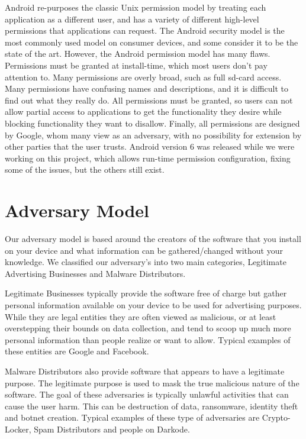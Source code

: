 Android re-purposes the classic Unix permission model by treating each application as a different user, and has a variety of different high-level permissions that applications can request.
The Android security model is the most commonly used model on consumer devices, and some consider it to be the state of the art.
However, the Android permission model has many flaws.
Permissions must be granted at install-time, which most users don't pay attention to.
Many permissions are overly broad, such as full sd-card access.
Many permissions have confusing names and descriptions, and it is difficult to find out what they really do.
All permissions must be granted, so users can not allow partial access to applications to get the functionality they desire while blocking functionality they want to disallow.
Finally, all permissions are designed by Google, whom many view as an adversary, with no possibility for extension by other parties that the user trusts.
Android version 6 was released while we were working on this project, which allows run-time permission configuration, fixing some of the issues, but the others still exist.


\section{Adversary Model}\label{section:adversary-model}
Our adversary model is based around the creators of the software that you install on your device and what information can be gathered/changed without your knowledge. We classified our adversary's into two main categories, Legitimate Advertising Businesses and Malware Distributors.

Legitimate Businesses typically provide the software free of charge but gather personal information available on your device to be used for advertising purposes.  While they are legal entities they are often viewed as malicious, or at least overstepping their bounds on data collection, and tend to scoop up much more personal information than people realize or want to allow. Typical examples of these entities are Google and Facebook.  

Malware Distributors also provide software that appears to have a legitimate purpose. The legitimate purpose is used to mask the true malicious nature of the software. The goal of these adversaries is typically unlawful activities that can cause the user harm. This can be destruction of data, ransomware, identity theft and botnet creation. Typical examples of these type of adversaries are Crypto-Locker, Spam Distributors and people on Darkode.

